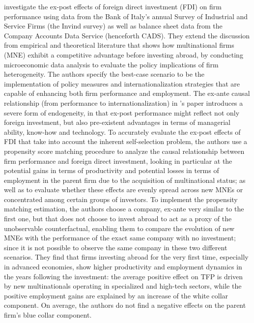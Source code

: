\documentclass[11pt,a4paper,leqno]{article}
\begin{document}
\cite{borin2016foreign} investigate the ex-post effects of foreign direct investment (FDI) on firm performance using data from the Bank of Italy’s annual Survey of Industrial and Service Firms (the Invind survey) as well as balance sheet data from the Company Accounts Data Service (henceforth CADS).  They extend the discussion from empirical and theoretical literature that shows how multinational firms (MNE) exhibit a competitive advantage before investing abroad, by conducting microeconomic data analysis to evaluate the policy implications of firm heterogeneity. The authors specify the best-case scenario to be the implementation of policy measures and internationalization strategies that are capable of enhancing both firm performance and employment. The ex-ante causal relationship (from performance to internationalization) in \cite{borin2016foreign}’s paper introduces a severe form of endogeneity, in that ex-post performance might reflect not only foreign investment, but also pre-existent advantages in terms of managerial ability, know-how and technology. To accurately evaluate the ex-post effects of FDI that take into account the inherent self-selection problem, the authors use a propensity score matching procedure to analyze the causal relationship between firm performance and foreign direct investment, looking in particular at the potential gains in terms of productivity and potential losses in terms of employment in the parent firm due to the acquisition of multinational status; as well as to evaluate whether these effects are evenly spread across new MNEs or concentrated among certain groups of investors. To implement the propensity matching estimation, the authors choose a company, ex-ante very similar to the first one, but that does not choose to invest abroad to act as a proxy of the unobservable counterfactual, enabling them to compare the evolution of new MNEs with the performance of the exact same company with no investment; since it is not possible to observe the same company in these two different scenarios. They find that firms investing abroad for the very first time, especially in advanced economies, show higher productivity and employment dynamics in the years following the investment: the average positive effect on TFP is driven by new multinationals operating in specialized and high-tech sectors, while the positive employment gains are explained by an increase of the white collar component. On average, the authors do not find a negative effects on the parent firm's blue collar component.
\end{document}

